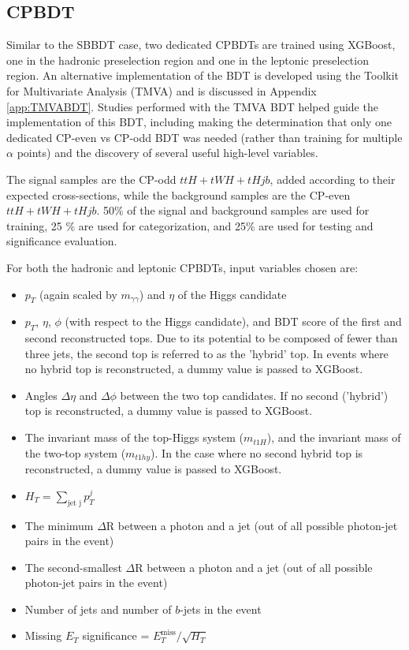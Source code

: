 \subsection{CPBDT}

Similar to the SBBDT case, two dedicated CPBDTs are trained using XGBoost, one in the hadronic preselection region and one in the leptonic preselection region. An alternative implementation of the BDT is developed using the Toolkit for Multivariate Analysis (TMVA) \cite{TMVA} and is discussed in Appendix \ref{app:TMVABDT}. Studies performed with the TMVA BDT helped guide the implementation of this BDT, including making the determination that only one dedicated CP-even vs CP-odd BDT was needed (rather than training for multiple $\alpha$ points) and the discovery of several useful high-level variables.

The signal samples are the CP-odd $ttH+tWH+tHjb$, added according to their expected cross-sections, while the background samples are the CP-even $ttH+tWH+tHjb$. 50\% of the signal and background samples are used for training, 25 \% are used for categorization, and 25\% are used for testing and significance evaluation.

For both the hadronic and leptonic CPBDTs, input variables chosen are:

\begin{itemize}
\item $p_{T}$ (again scaled by $m_{\gamma \gamma}$) and $\eta$ of the Higgs candidate
\item $p_{T}$, $\eta$, $\phi$ (with respect to the Higgs candidate), and BDT score of the first and second reconstructed tops. Due to its potential to be composed of fewer than three jets, the second top is referred to as the 'hybrid' top. In events where no hybrid top is reconstructed, a dummy value is passed to XGBoost.
\item Angles $\Delta\eta$ and $\Delta\phi$ between the two top candidates. If no second ('hybrid') top is reconstructed, a dummy value is passed to XGBoost.
\item The invariant mass of the top-Higgs system ($m_{t1H}$), and the invariant mass of the two-top system ($m_{t1hy}$). In the case where no second hybrid top is reconstructed, a dummy value is passed to XGBoost.
\item $H_{T} = \sum_\text{jet j} p^{j}_{T}$
\item The minimum $\Delta$R between a photon and a jet (out of all possible photon-jet pairs in the event)
\item The second-smallest $\Delta$R between a photon and a jet (out of all possible photon-jet pairs in the event)
\item Number of jets and number of $b$-jets in the event
\item Missing $E_{T}$ significance = $E_{T}^\text{miss}/\sqrt{H_{T}}$
\end{itemize}

